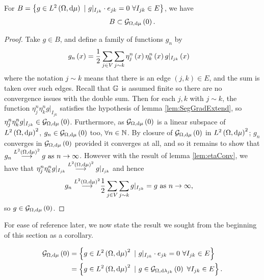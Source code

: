 \begin{prop} \label{prop:BIncGrad0}
	For $B = \clbracs{g\in\ltwo{\ddom}{\ddmes} \ \vert \ g\vert_{I_{jk}}\cdot e_{jk}=0 \ \forall I_{jk}\in E}$, we have
	\begin{align*}
		B \subset \mathcal{G}_{ \Omega, \mathrm{d}\mu}\left( 0 \right).
	\end{align*}
\end{prop}
\begin{proof}
	Take $g\in B$, and define a family of functions $g_n$ by
	\begin{align*}
		g_n\left( x \right) &= \frac{1}{2}\sum_{j\in V}\sum_{j\sim k}\eta_j^n\left( x \right)\eta_k^n\left( x \right)g\vert_{I_{jk}}\left( x \right)
	\end{align*}
	where the notation $j\sim k$ means that there is an edge $(j,k)\in E$, and the sum is taken over such edges. 
	Recall that $\mathbb{G}$ is assumed finite so there are no convergence issues with the double sum.
	Then for each $j,k$ with $j\sim k$, the function $\eta_j^n\eta_k^n g\vert_{I_{jk}}$ satisfies the hypothesis of lemma \ref{lem:SegGradExtend}, so $\eta_j^n\eta_k^n g\vert_{I_{jk}}\in\mathcal{G}_{ \Omega, \mathrm{d}\mu}\left( 0 \right)$.
	Furthermore, as $\mathcal{G}_{ \Omega, \mathrm{d}\mu}\left( 0 \right)$ is a linear subspace of $L^{2}\left( \Omega,\mathrm{d}\mu \right)^{2}$, $g_n\in\mathcal{G}_{ \Omega, \mathrm{d}\mu}\left( 0 \right)$ too, $\forall n\in\mathbb{N}$.
	By closure of $\mathcal{G}_{ \Omega, \mathrm{d}\mu}\left( 0 \right)$ in $L^{2}\left( \Omega,\mathrm{d}\mu \right)^2$; $g_n$ converges in $\mathcal{G}_{ \Omega, \mathrm{d}\mu}\left( 0 \right)$ provided it converges at all, and so it remains to show that $g_n\overset{L^{2}\left( \Omega,\mathrm{d}\mu \right)^2}{\longrightarrow} g \ \text{as} \ n \rightarrow\infty$.
	However with the result of lemma \ref{lem:etaConv}, we have that $\eta_j^n\eta_k^n g\vert_{I_{jk}}\overset{L^{2}\left( \Omega,\mathrm{d}\mu \right)^2}{\longrightarrow} g\vert_{I_{jk}}$ and hence
	\begin{align*}
		g_n \overset{L^{2}\left( \Omega,\mathrm{d}\mu \right)^2}{\longrightarrow} &\frac{1}{2}\sum_{j\in V}\sum_{j\sim k}g\vert_{I_{jk}} = g \ \text{as} \ n \rightarrow\infty,
	\end{align*}
	so $g\in\mathcal{G}_{ \Omega, \mathrm{d}\mu}\left( 0 \right)$.
\end{proof}

For ease of reference later, we now state the result we sought from the beginning of this section as a corollary.
\begin{cory} \label{cory:CharacterisationGradientsZero}
	\begin{align*}
		\gradZero{\ddom}{\ddmes} &= \clbracs{g\in\ltwo{\ddom}{\ddmes}^2 \ \vert \ g\vert_{I_{jk}}\cdot e_{jk}=0 \ \forall I_{jk}\in E} \\
		&= \clbracs{g\in\ltwo{\ddom}{\ddmes}^2 \ \vert \ g\in\gradZero{\ddom}{\lambda_{jk}} \ \forall I_{jk}\in E}.
	\end{align*}
\end{cory}


